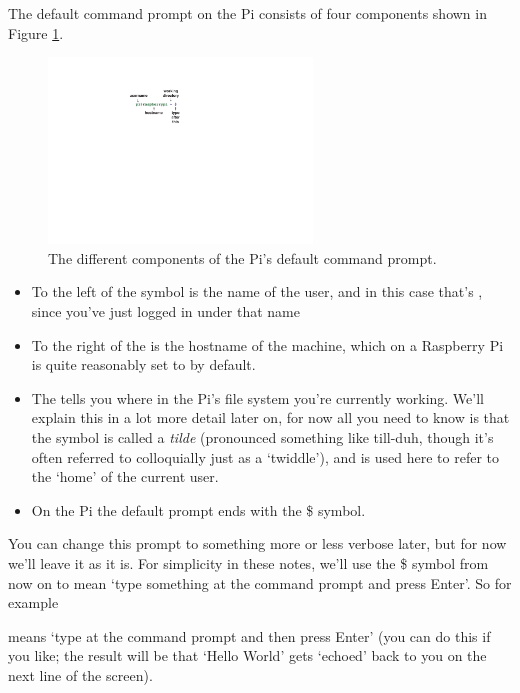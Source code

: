The default command prompt on the Pi consists of four components shown in Figure \ref{figure:prompt}.

\begin{figure}
\centerline{\includegraphics[width=7cm]{images/default-prompt}}
\caption{The different components of the Pi's default command prompt.}\label{figure:prompt}
\end{figure}


\begin{itemize}
\item To the left of the  symbol is the name of the user, and in this case that's , since you've just logged in under that name
\item To the right of the  is the hostname of the machine, which on a Raspberry Pi is quite reasonably set to  by default.
\item The \texttildelow{} tells you where in the Pi's file system you're currently working. We'll explain this in a lot more detail later on, for now all you need to know is that the \texttildelow{} symbol is called a \textit{tilde} (pronounced something like till-duh, though it's often referred to colloquially just as a `twiddle'), and is used here to refer to the `home' of the current user. 
\item On the Pi the default prompt ends with the \$ symbol. 
\end{itemize}

You can change this prompt to something more or less verbose later, but for now we'll leave it as it is. For simplicity in these notes, we'll use the \$ symbol from now on to mean `type something at the command prompt and press Enter'. So for example


\noindent means `type  at the command prompt and then press Enter' (you can do this if you like; the result will be that `Hello World' gets `echoed'  back to you on the next line of the screen). 

